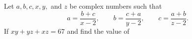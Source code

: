 Let $a,b,c,x,y,$ and $z$ be complex numbers such that \[a=\dfrac{b+c}{x-2},\qquad b=\dfrac{c+a}{y-2},\qquad c=\dfrac{a+b}{z-2}.\] If $xy+yz+xz=67$ and  find the value of 